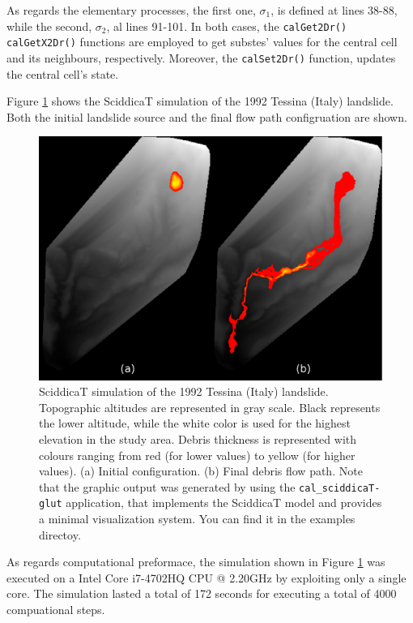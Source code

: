 As regards the elementary processes, the first one, $\sigma_1$, is
defined at lines 38-88, while the second, $\sigma_2$, al lines
91-101. In both cases, the \verb'calGet2Dr()' \verb'calGetX2Dr()'
functions are employed to get substes' values for the central cell and
its neighbours, respectively. Moreover, the \verb'calSet2Dr()'
function, updates the central cell's state.

Figure \ref{fig:sciddicaT} shows the SciddicaT simulation of the 1992
Tessina (Italy) landslide. Both the initial landslide source and the
final flow path configruation are shown.

\begin{figure}[htbp]
  \centering
  \includegraphics[width=12cm]{./images/OpenCAL/sciddicaT}
  \caption{SciddicaT simulation of the 1992 Tessina (Italy)
    landslide. Topographic altitudes are represented in gray
    scale. Black represents the lower altitude, while the white color
    is used for the highest elevation in the study area. Debris
    thickness is represented with colours ranging from red (for lower
    values) to yellow (for higher values). (a) Initial
    configuration. (b) Final debris flow path. Note that the graphic
    output was generated by using the \texttt{cal\_sciddicaT-glut}
    application, that implements the SciddicaT model and provides a
    minimal visualization system. You can find it in the examples
    directoy.}
  \label{fig:sciddicaT}
\end{figure}

As regards computational preformace, the simulation shown in Figure
\ref{fig:sciddicaT} was executed on a Intel Core i7-4702HQ CPU @
2.20GHz by exploiting only a single core. The simulation lasted a
total of 172 seconds for executing a total of 4000 compuational steps.

